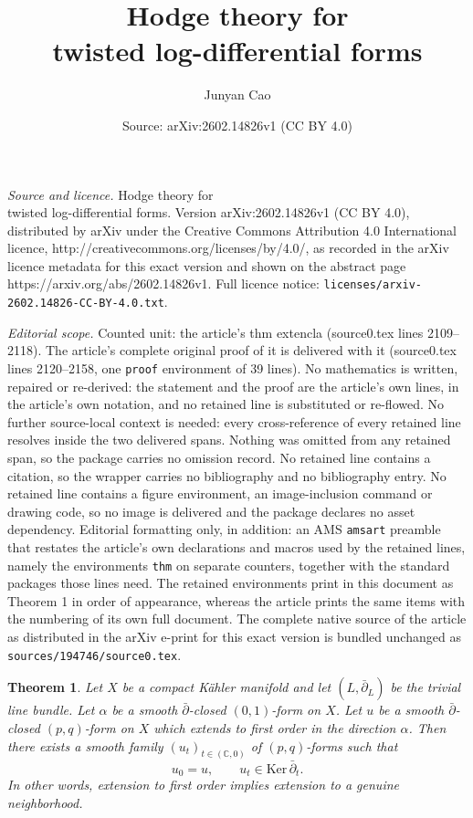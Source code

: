 \documentclass[10pt,a4paper]{amsart}
\title{Hodge theory for \\ twisted log-differential forms}
\author{Junyan Cao}
\date{Source: arXiv:2602.14826v1 (CC BY 4.0)}
\newtheorem{thm}{Theorem}
\newcommand{\CC}{\mathbb{C}}
\newcommand{\dbar}{\bar \partial}
\renewcommand{\ker}{\mathrm{Ker} \,}
\begin{document}
\maketitle

\noindent\emph{Source and licence.} Hodge theory for \\ twisted log-differential forms. Version arXiv:2602.14826v1 (CC BY 4.0), distributed by arXiv under the Creative Commons Attribution 4.0 International licence, http://creativecommons.org/licenses/by/4.0/, as recorded in the arXiv licence metadata for this exact version and shown on the abstract page https://arxiv.org/abs/2602.14826v1. Full licence notice: \texttt{licenses/arxiv-2602.14826-CC-BY-4.0.txt}.\par\smallskip

\noindent\textit{Editorial scope.} Counted unit: the article's thm extencla (source0.tex lines 2109--2118). The article's complete original proof of it is delivered with it (source0.tex lines 2120--2158, one \texttt{proof} environment of 39 lines). No mathematics is written, repaired or re-derived: the statement and the proof are the article's own lines, in the article's own notation, and no retained line is substituted or re-flowed.  No further source-local context is needed: every cross-reference of every retained line resolves inside the two delivered spans.  Nothing was omitted from any retained span, so the package carries no omission record.  No retained line contains a citation, so the wrapper carries no bibliography and no bibliography entry.  No retained line contains a figure environment, an image-inclusion command or drawing code, so no image is delivered and the package declares no asset dependency.  Editorial formatting only, in addition: an AMS \texttt{amsart} preamble that restates the article's own declarations and macros used by the retained lines, namely the environments \texttt{thm} on separate counters, together with the standard packages those lines need.  The retained environments print in this document as Theorem 1 in order of appearance, whereas the article prints the same items with the numbering of its own full document.  The complete native source of the article as distributed in the arXiv e-print for this exact version is bundled unchanged as \texttt{sources/194746/source0.tex}.
\begin{thm}\label{extencla}
	Let $X$ be a compact K\"ahler manifold and let $(L,\dbar_L)$ be the trivial line bundle.
	Let $\alpha$ be a smooth $\dbar$-closed $(0,1)$-form on $X$.
	Let $u$ be a smooth $\dbar$-closed $(p,q)$-form on $X$ which extends to first order in the direction $\alpha$.
	Then there exists a smooth family $(u_t)_{t\in (\CC,0)}$ of $(p,q)$-forms such that
	\begin{equation}\label{intr4}
		u_0 = u, \qquad u_t \in \ker \dbar_t.
	\end{equation}
	In other words, extension to first order implies extension to a genuine neighborhood.
\end{thm}
\end{document}
